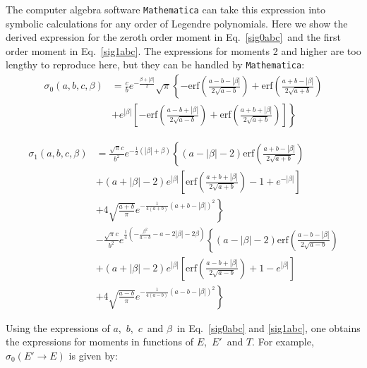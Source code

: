 \documentclass[review]{elsarticle}
\begin{document}
The computer algebra software {\tt Mathematica} can take this expression into symbolic calculations for any order of Legendre polynomials\cite{mathematica9}. %
Here we show the derived expression for the zeroth order moment in Eq.~\eqref{sig0abc}~and the first order moment in Eq.~\eqref{sig1abc}. The expressions for moments 2 and higher are too lengthy to reproduce here, but they can be handled by {\tt Mathematica}:
\begin{align}\label{sig0abc}
\sigma_0(a,b,c,\beta)&=\frac{c}{b}e^{-\frac{\beta+|\beta|}{2}}\sqrt{\pi}\left\{-\mathrm{erf}\left(\frac{a-b-|\beta|}{2\sqrt{a-b}}\right)+\mathrm{erf}\left(\frac{a+b-|\beta|}{2\sqrt{a+b}}\right)\right.\nonumber\\
&\left.+e^{|\beta|}\left[-\mathrm{erf}\left(\frac{a-b+|\beta|}{2\sqrt{a-b}}\right)+\mathrm{erf}\left(\frac{a+b+|\beta|}{2\sqrt{a+b}}\right)\right]\right\}
\end{align}

\begin{align}\label{sig1abc}
\sigma_1(a,b,c,\beta)&=\frac{\sqrt{\pi}c}{b^2}e^{-\frac{1}{2} \left(|\beta|+\beta
		\right)} \left\{\left(a-|\beta|-2\right) \mathrm{erf}\left(\frac{a+b-|\beta|}{2 \sqrt{a+b}}\right)\right.\nonumber\\
	&\left.
	+\left(a+|\beta|-2\right)
	e^{|\beta|}
	\left[\mathrm{erf}\left(\frac{a+b+|\beta|}{2 \sqrt{a+b}}\right)-1+e^{-|\beta|}\right]
	\right.\nonumber\\
	&\left.+4\sqrt{\frac{a+b}{\pi}}
	e^{-\frac{1}{4(a+b)}\left(a+b-|\beta|\right)^2} \right\}\nonumber\\ %
	&-\frac{\sqrt{\pi}c}{b^2}e^{\frac{1}{4} \left(
		-\frac{\beta
			^2}{a-b}-a-2 |\beta|-2 \beta \right)}
	\left\{\left(a-|\beta|-2\right) \mathrm{erf}\left(\frac{a-b-|\beta|}{2
		\sqrt{a-b}}\right)\right.\\
	&\left.+ \left(a+|\beta|-2\right)
	e^{|\beta|}\left[
	\mathrm{erf}\left(\frac{a-b+|\beta|}{2 \sqrt{a-b}}\right)+1-e^{|\beta|}\right]\right.\nonumber\\
	&\left.+4
	\sqrt{\frac{a-b}{\pi}} e^{-\frac{1}{4(a-b)} \left(a-b-|\beta|\right)^2}\right\}\nonumber
\end{align}


Using the expressions of $a$,~$b$,~$c$~and $\beta$~in Eq.~\eqref{sig0abc} and \eqref{sig1abc}, one obtains the expressions for moments in functions of $E$,~$E'$~and $T$. For example, $\sigma_0(E'\to E)$ is given by:
\end{document}
